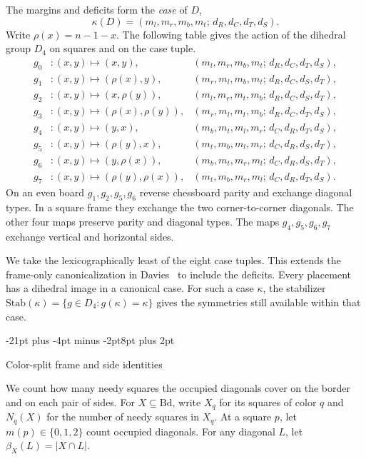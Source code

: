 \documentclass[11pt,a4paper]{article}
\makeatletter
\renewcommand{\section}{\@startsection{section}{1}{\z@}%
  {-21pt plus -4pt minus -2pt}{8pt plus 2pt}%
  {\normalfont\fontsize{14}{17}\selectfont\bfseries\raggedright}}
\theoremstyle{result}
\theoremstyle{definition}
\theoremstyle{remark}
\newcommand{\Bd}{\mathrm{Bd}}
\newcommand{\Stab}{\mathrm{Stab}}
\makeatother
\begin{document}
The margins and deficits form the \emph{case} of $D$,
\[
  \kappa(D)=(m_l,m_r,m_b,m_t;\,d_R,d_C,d_T,d_S).
\]
Write $\rho(x)=n-1-x$. The following table gives the action of
the dihedral group $D_4$ on squares and on the case tuple.
\begin{align*}
  g_0 &: (x,y)\mapsto(x,y),           & (m_l,m_r,m_b,m_t;\,d_R,d_C,d_T,d_S),\\
  g_1 &: (x,y)\mapsto(\rho(x),y),     & (m_r,m_l,m_b,m_t;\,d_R,d_C,d_S,d_T),\\
  g_2 &: (x,y)\mapsto(x,\rho(y)),     & (m_l,m_r,m_t,m_b;\,d_R,d_C,d_S,d_T),\\
  g_3 &: (x,y)\mapsto(\rho(x),\rho(y)), & (m_r,m_l,m_t,m_b;\,d_R,d_C,d_T,d_S),\\
  g_4 &: (x,y)\mapsto(y,x),           & (m_b,m_t,m_l,m_r;\,d_C,d_R,d_T,d_S),\\
  g_5 &: (x,y)\mapsto(\rho(y),x),     & (m_t,m_b,m_l,m_r;\,d_C,d_R,d_S,d_T),\\
  g_6 &: (x,y)\mapsto(y,\rho(x)),     & (m_b,m_t,m_r,m_l;\,d_C,d_R,d_S,d_T),\\
  g_7 &: (x,y)\mapsto(\rho(y),\rho(x)), & (m_t,m_b,m_r,m_l;\,d_C,d_R,d_T,d_S).
\end{align*}
On an even board $g_1,g_2,g_5,g_6$ reverse chessboard parity and exchange
diagonal types. In a square frame they exchange the two corner-to-corner
diagonals. The other four maps preserve parity and diagonal types.
The maps $g_4,g_5,g_6,g_7$ exchange vertical and horizontal sides.

We take the lexicographically least of the eight case tuples.
This extends the frame-only canonicalization in
Davies~\cite[Sections~2 and~4]{Davies2026} to include the deficits.
Every placement has a dihedral image in a canonical case.
For such a case $\kappa$, the stabilizer
$\Stab(\kappa)=\{g\in D_4:g(\kappa)=\kappa\}$ gives the symmetries
still available within that case.

\section{Color-split frame and side identities}\label{sec:colorsplit}

We count how many needy squares the occupied diagonals cover on
the border and on each pair of sides. For $X\subseteq\Bd$, write
$X_q$ for its squares of color $q$ and $N_q(X)$ for the number
of needy squares in $X_q$. At a square $p$, let $m(p)\in\{0,1,2\}$
count occupied diagonals. For any diagonal $L$, let
$\beta_X(L)=|X\cap L|$.
\end{document}
